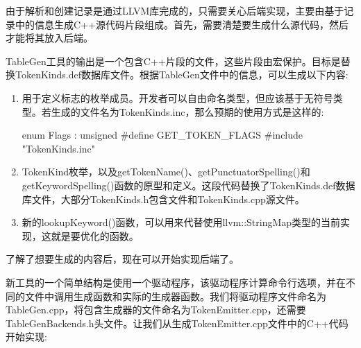 由于解析和创建记录是通过LLVM库完成的，只需要关心后端实现，主要由基于记录中的信息生成C++源代码片段组成。首先，需要清楚要生成什么源代码，然后才能将其放入后端。


TableGen工具的输出是一个包含C++片段的文件，这些片段由宏保护。目标是替换TokenKinds.def数据库文件。根据TableGen文件中的信息，可以生成以下内容:

\begin{enumerate}
\item
用于定义标志的枚举成员。开发者可以自由命名类型，但应该基于无符号类型。若生成的文件名为TokenKinds.inc，那么预期的使用方式是这样的:

\begin{cpp}
enum Flags : unsigned {
    #define GET_TOKEN_FLAGS
    #include "TokenKinds.inc"
}
\end{cpp}

\item
TokenKind枚举，以及getTokenName()、getPunctuatorSpelling()和getKeywordSpelling()函数的原型和定义。这段代码替换了TokenKinds.def数据库文件，大部分TokenKinds.h包含文件和TokenKinds.cpp源文件。

\item
新的lookupKeyword()函数，可以用来代替使用llvm::StringMap类型的当前实现，这就是要优化的函数。
\end{enumerate}

了解了想要生成的内容后，现在可以开始实现后端了。


新工具的一个简单结构是使用一个驱动程序，该驱动程序计算命令行选项，并在不同的文件中调用生成函数和实际的生成器函数。我们将驱动程序文件命名为TableGen.cpp，将包含生成器的文件命名为TokenEmitter.cpp，还需要TableGenBackends.h头文件。让我们从生成TokenEmitter.cpp文件中的C++代码开始实现:

